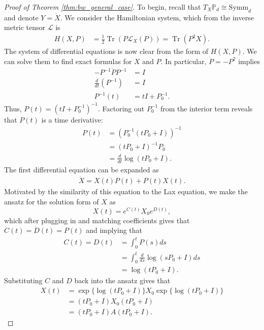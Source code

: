 \documentclass[10pt,a4paper]{amsart}
\DeclareMathOperator{\Tr}{Tr}
\begin{document}
\begin{proof}[Proof of Theorem \ref{thm:bw_general_case}]
To begin, recall that $T_X\mathbb{P}_d \cong \text{Symm}_d$ and denote $Y = \dot{X}$. We consider the Hamiltonian system, which from the inverse metric tensor $\mathcal{L}$ is
\begin{align}
    H(X, P) &= \frac{1}{2}\Tr(P\mathcal{L}_X(P)) = \Tr(P^2X).
\end{align}
The system of differential equations is now clear from the form of $H(X,P)$. We can solve them to find exact formulas for $X$ and $P$. In particular, $\dot{P} = -P^2$ implies
\begin{align}
    -P^{-1} \dot{P} P^{-1} &= I \nonumber \\
    \frac{d}{dt}(P^{-1}) &= I \nonumber \\
    P^{-1}(t) &= tI + P^{-1}_0.
\end{align}
Thus, $P(t) = (tI + P^{-1}_0)^{-1}$. Factoring out $P^{-1}_0$ from the interior term reveals that $P(t)$ is a time derivative:
\begin{align}
    P(t) &= (P^{-1}_0(tP_0 + I))^{-1}  \nonumber \\
    &= (tP_0 + I)^{-1}P_0 \\
    &= \frac{d}{dt} \log (tP_0 + I).
\end{align}
The first differential equation can be expanded as
\begin{align}
    \dot{X} = X(t)P(t) + P(t)X(t).
\end{align}
Motivated by the similarity of this equation to the Lax equation, we make the ansatz for the solution form of $X$ as
\begin{equation}
    X(t) = e^{C(t)} X_0 e^{D(t)},
\end{equation}
which after plugging in and matching coefficients gives that $\dot{C}(t) = \dot{D}(t) = P(t)$ and implying that 
\begin{align}
    C(t) = D(t) &= \int_0^t P(s) ds\\
    &= \int_{0}^t \frac{d}{ds}\log(sP_0 + I) ds \\
    &= \log (tP_0+I).
\end{align}
Substituting $C$ and $D$ back into the ansatz gives that 
\begin{align}
    X(t) &= \exp\{\log (tP_0+I)\} X_0 \exp\{\log (tP_0+I)\}\nonumber \\
    &= (tP_0 + I) X_0 (tP_0 + I) \nonumber \\ 
    &= (tP_0 + I) A (tP_0 + I).
\end{align}

\end{proof}
\end{document}
